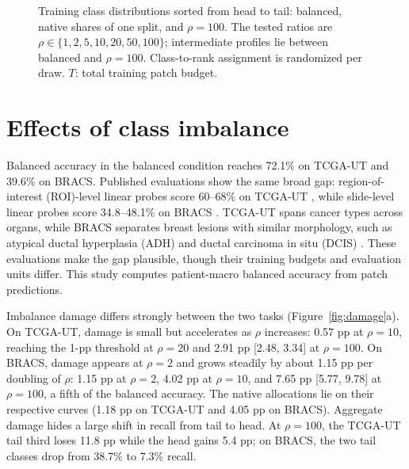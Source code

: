\documentclass[11pt]{article}
\newcommand{\countlines}[1]{%
  \addplot[black,thick,mark=*,mark size=1pt] table[x=rank,y=r1]{#1};
  \addplot[red!80!black,thick,dashed,mark=square*,mark size=1pt] table[x=rank,y=N]{#1};
  \addplot[tcga,thick,mark=triangle*,mark size=1.4pt] table[x=rank,y=r100]{#1};}
\begin{document}
\begin{figure}[!htb]
\centering
{}
\caption{Training class distributions sorted from head to tail: balanced, native shares of one split, and $\rho=100$. The tested ratios are $\rho\in\{1,2,5,10,20,50,100\}$; intermediate profiles lie between balanced and $\rho=100$. Class-to-rank assignment is randomized per draw. $T$: total training patch budget.}
\label{fig:dist}
\end{figure}

\section{Effects of class imbalance}
Balanced accuracy in the balanced condition reaches 72.1\% on TCGA-UT and 39.6\% on BRACS. Published evaluations show the same broad gap: region-of-interest (ROI)-level linear probes score 60--68\% on TCGA-UT \citep{mahmoodlab2025uniRepo}, while slide-level linear probes score 34.8--48.1\% on BRACS \citep{vaidya2025threads}. TCGA-UT spans cancer types across organs, while BRACS separates breast lesions with similar morphology, such as atypical ductal hyperplasia (ADH) and ductal carcinoma in situ (DCIS) \citep{brancati2022bracs}. These evaluations make the gap plausible, though their training budgets and evaluation units differ. This study computes patient-macro balanced accuracy from patch predictions.

Imbalance damage differs strongly between the two tasks (Figure~\ref{fig:damage}a). On TCGA-UT, damage is small but accelerates as $\rho$ increases: 0.57 pp at $\rho=10$, reaching the 1-pp threshold at $\rho=20$ and 2.91 pp [2.48, 3.34] at $\rho=100$. On BRACS, damage appears at $\rho=2$ and grows steadily by about 1.15 pp per doubling of $\rho$: 1.15 pp at $\rho=2$, 4.02 pp at $\rho=10$, and 7.65 pp [5.77, 9.78] at $\rho=100$, a fifth of the balanced accuracy. The native allocations lie on their respective curves (1.18 pp on TCGA-UT and 4.05 pp on BRACS). Aggregate damage hides a large shift in recall from tail to head. At $\rho=100$, the TCGA-UT tail third loses 11.8 pp while the head gains 5.4 pp; on BRACS, the two tail classes drop from 38.7\% to 7.3\% recall.
\end{document}
